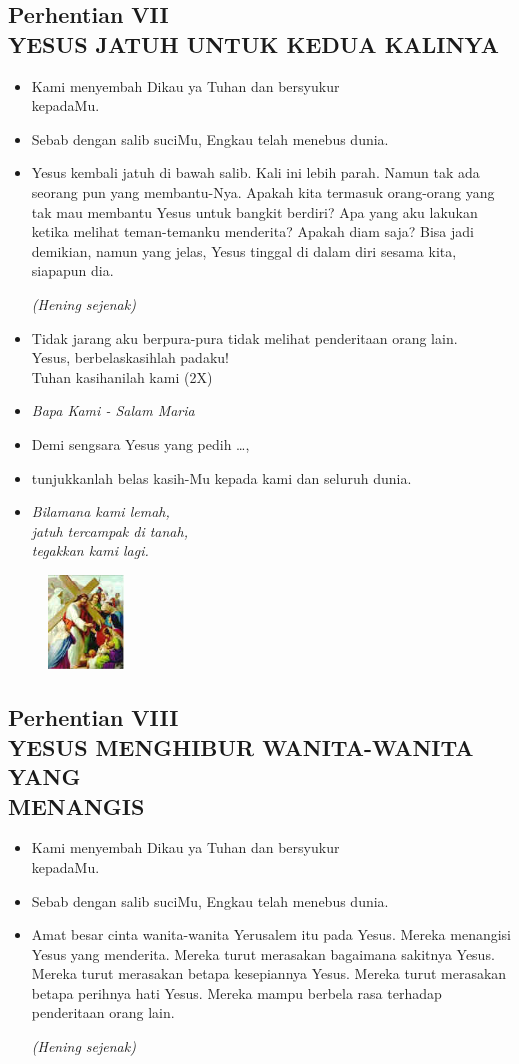 \documentclass[a5paper,headsepline,titlepage,11pt,nnormalheadings,DIVcalc]{scrbook}
\newcommand{\BU}[1]{\begin{itemize} \item[U:] #1 \end{itemize}}
\newcommand{\BP}[1]{\begin{itemize} \item[P:] #1 \end{itemize}}
\newcommand{\kamiMenyembah}{\BP{ Kami menyembah Dikau ya Tuhan dan bersyukur\\kepadaMu.}
\BU{ Sebab dengan salib suciMu, Engkau telah menebus dunia.}
}
\newcommand{\kasihanilahKami}{\BP{Demi sengsara Yesus yang pedih \ldots,}
\BU{tunjukkanlah belas kasih-Mu kepada kami dan seluruh dunia.}}
\def\hening{\par \textit{(Hening sejenak)}}
\begin{document}
\subsection*{Perhentian VII\\
YESUS JATUH UNTUK KEDUA KALINYA}

\kamiMenyembah

\BP{Yesus kembali jatuh di bawah salib. Kali ini lebih parah. Namun tak ada seorang pun yang membantu-Nya. Apakah kita termasuk orang-orang yang tak mau membantu Yesus untuk bangkit berdiri? Apa yang aku lakukan ketika melihat teman-temanku menderita? Apakah diam saja? Bisa jadi demikian, namun yang jelas, Yesus tinggal di dalam diri sesama kita, siapapun dia.
\hening
}

\BU{Tidak jarang aku berpura-pura tidak melihat penderitaan orang lain.\\ Yesus, berbelaskasihlah padaku!\\
Tuhan kasihanilah kami (2X)
}


\large\begin{itemize}\item[~]\it{Bapa Kami - Salam Maria}\end{itemize}\normalsize
\kasihanilahKami

\begin{itemize}
\item[8.] \it{Bilamana kami lemah,\\
	 jatuh tercampak di tanah,\\ 
	tegakkan kami lagi.}
\end{itemize}

\begin{figure}
\includegraphics[width=2cm]{jalansalib_files/08_small.jpg}
\end{figure}
\subsection*{Perhentian VIII\\
YESUS MENGHIBUR WANITA-WANITA YANG\\MENANGIS}
\kamiMenyembah

\BP{Amat besar cinta wanita-wanita Yerusalem itu pada Yesus. Mereka menangisi Yesus yang menderita. Mereka turut merasakan bagaimana sakitnya Yesus. Mereka turut merasakan betapa kesepiannya Yesus. Mereka turut merasakan betapa perihnya hati Yesus. Mereka mampu berbela rasa terhadap penderitaan orang lain.
\hening 
}
\end{document}

